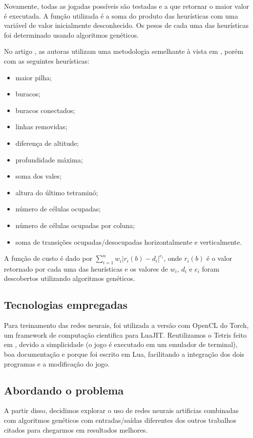 \documentclass[conference]{IEEEtran}
\begin{document}
Novamente, todas as jogadas possíveis são testadas e a que retornar o maior valor é executada. A função utilizada é a soma do produto das heurísticas com uma variável de valor inicialmente desconhecido. Os pesos de cada uma das heurísticas foi determinado usando algoritmos genéticos. 

No artigo \cite{b10}, as autoras utilizam uma metodologia semelhante à vista em \cite{b9}, porém com as seguintes heurísticas: 

\begin{itemize}
\item maior pilha; 
\item buracos;
\item buracos conectados;
\item linhas removidas;
\item diferença de altitude;
\item profundidade máxima;
\item soma dos vales;
\item altura do último tetraminó; 
\item número de células ocupadas;
\item número de células ocupadas por coluna;
\item soma de transições ocupadas/desocupadas horizontalmente e verticalmente. 
\end{itemize}

A função de custo é dado por $\sum_{i=1}^n  w_{i}|r_{i}(b)-d_{i} | ^{e_{i}}$, onde $r_{i}(b)$ é o valor retornado por cada uma das heurísticas e os valores de $w_i$, $d_i$ e $e_i$ foram descobertos utilizando algoritmos genéticos.

\subsection{Tecnologias empregadas}
Para treinamento das redes neurais, foi utilizada a versão com OpenCL\cite{b11} do Torch\cite{b12}, um framework de computação cientifica para LuaJIT\cite{b13}. Reutilizamos o Tetris feito em \cite{b14}, devido a simplicidade (o jogo é executado em um emulador de terminal), boa documentação e porque foi escrito em Lua, facilitando a integração dos dois programas e a modificação do jogo.

\subsection{Abordando o problema}
A partir disso, decidimos explorar o uso de redes neurais artificias combinadas com algoritmos genéticos com entradas/saídas diferentes dos outros trabalhos citados para chegarmos em resultados melhores.
\end{document}
